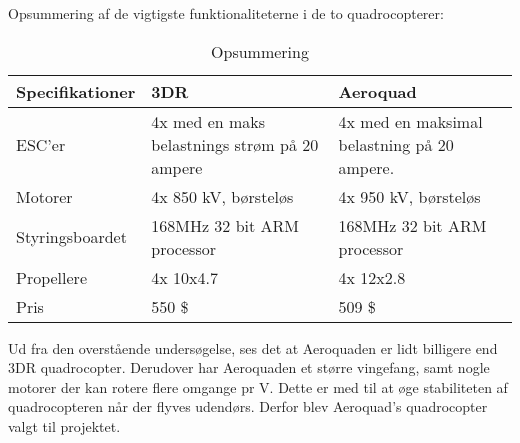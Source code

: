 Opsummering af de vigtigste funktionaliteterne i de to quadrocopterer:
\begin{table}[H]
	\centering
		\begin{tabular}{|p{3.5cm}|p{5 cm}|p{5 cm}|} 
		\hline
			\textbf{Specifikationer} & \textbf{3DR} 	& \textbf{Aeroquad} \\ \hline
					ESC'er &  4x med en maks belastnings strøm på 20 ampere				& 4x med en maksimal belastning på 20 ampere.	\\ \hline
			 		Motorer	& 4x 850 kV, børsteløs	& 4x 950 kV, børsteløs			\\ \hline
			 		Styringsboardet	& 168MHz 32 bit ARM processor				& 168MHz 32 bit ARM processor		\\ \hline
			 			Propellere & 4x 10x4.7 			& 4x 12x2.8					\\ \hline
			 			Pris & 	550 \$	& 509 \$				\\ \hline
		\end{tabular}
	\caption{Opsummering}
\end{table}

Ud fra den overstående undersøgelse, ses det at Aeroquaden er lidt billigere end 3DR quadrocopter. Derudover har Aeroquaden et større vingefang, samt nogle motorer der kan rotere flere omgange pr V. Dette er med til at øge stabiliteten af quadrocopteren når der flyves udendørs. Derfor blev Aeroquad's quadrocopter valgt til projektet.


